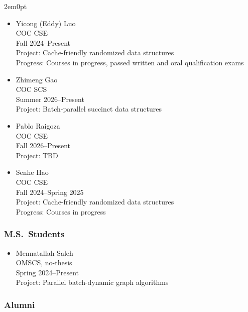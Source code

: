 \begin{adjustwidth}{2em}{0pt}
\begin{itemize}
    \item
        Yicong (Eddy) Luo \\
        COC CSE\\
        Fall 2024--Present \\
        Project: Cache-friendly randomized data structures\\
        Progress: Courses in progress, passed written and oral qualification exams
    \item
        Zhimeng Gao \\
        COC SCS\\
        Summer 2026--Present \\
        Project: Batch-parallel succinct data structures\\
    \item
        Pablo Raigoza \\
        COC CSE \\
        Fall 2026--Present \\
        Project: TBD\\
    \item
        Senhe Hao \\
        COC CSE\\
        Fall 2024--Spring 2025 \\
        Project: Cache-friendly randomized data structures\\
        Progress: Courses in progress
\end{itemize}

\subsubsection{M.S.\ Students}

\begin{itemize}
    \item Mennatallah Saleh\\
	OMSCS, no-thesis \\
	Spring 2024--Present\\
	Project: Parallel batch-dynamic graph algorithms
        \end{itemize}

\subsubsection{Alumni}


\end{adjustwidth}
